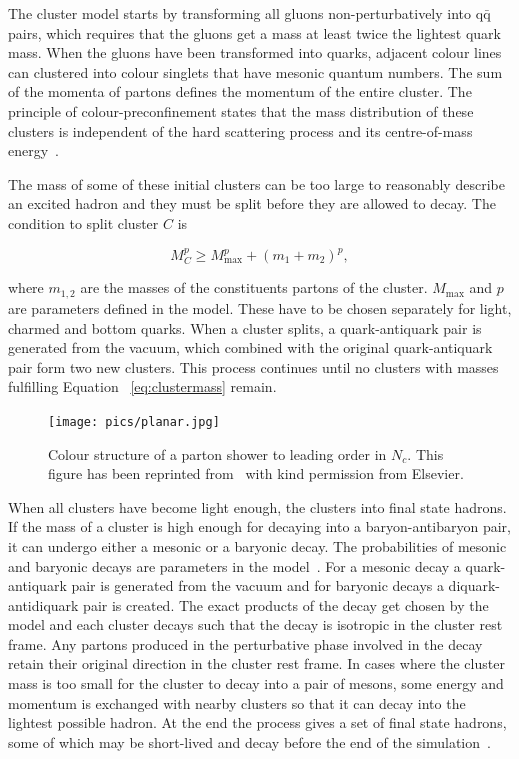 The cluster model starts by transforming all gluons non-perturbatively into $\mathrm{q \bar q}$ pairs, which requires that the gluons get a mass at least twice the lightest quark mass. When the gluons have been transformed into quarks, adjacent colour lines can clustered into colour singlets that have mesonic quantum numbers. The sum of the momenta of partons defines the momentum of the entire cluster. The principle of colour-preconfinement states that the mass distribution of these clusters is independent of the hard scattering process and its centre-of-mass energy~\cite{herwigManual}. %

The mass of some of these initial clusters can be too large to reasonably describe an excited hadron and they must be split before they are allowed to decay. The condition to split cluster $C$ is~\cite{herwigManual}

\begin{equation}
M_C^p \geq M_\mathrm{max}^p  + \left( m_1 + m_2\right)^p,
\label{eq:clustermass}
\end{equation}

\noindent where $m_{1,2}$ are the masses of the constituents partons of the cluster. $M_\mathrm{max}$ and $p$ are parameters defined in the model. These have to be chosen separately for light, charmed and bottom quarks. When a cluster splits, a quark-antiquark pair is generated from the vacuum, which combined with the original quark-antiquark pair form two new clusters. This process continues until no clusters with masses fulfilling Equation ~\ref{eq:clustermass} remain.

\begin{figure}
\centering
\texttt{[image: pics/planar.jpg]}
\caption[]{ Colour structure of a parton shower to leading order in $N_c$. This figure has been reprinted from~\cite{eventGenerators} with kind permission from Elsevier.}
\label{fig:colourstructure}
\end{figure}

When all clusters have become light enough, the clusters into final state hadrons. If the mass of a cluster is high enough for decaying into a baryon-antibaryon pair, it can undergo either a mesonic or a baryonic decay. The probabilities of mesonic and baryonic decays are parameters in the model~\cite{herwigManual}. For a mesonic decay a quark-antiquark pair is generated from the vacuum and for baryonic decays a diquark-antidiquark pair is created. The exact products of the decay get chosen by the model and each cluster decays such that the decay is isotropic in the cluster rest frame. Any partons produced in the perturbative phase involved in the decay retain their original direction in the cluster rest frame. In cases where the cluster mass is too small for the cluster to decay into a pair of mesons, some energy and momentum is exchanged with nearby clusters so that it can decay into the lightest possible hadron. At the end the process gives a set of final state hadrons, some of which may be short-lived and decay before the end of the simulation~\cite{herwigManual}.

